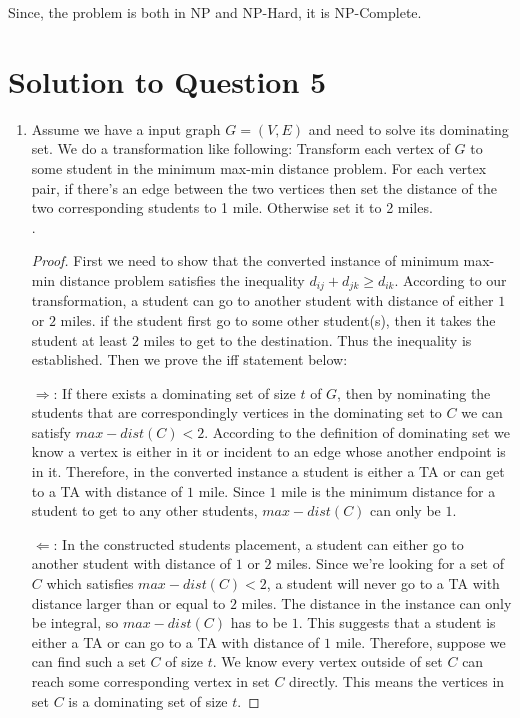 \documentclass[11pt]{article}
\begin{document}
   Since, the problem is both in NP and NP-Hard, it is NP-Complete.

\newpage
\section{Solution to Question 5} 

\begin{enumerate}[(1)]
  \item Assume we have a input graph $G = (V, E)$ and need to solve its dominating set.
We do a transformation like following: Transform each vertex of $G$ to some student in the minimum max-min distance problem.
For each vertex pair, if there's an edge between the two vertices then set the distance of the two corresponding students to 1 mile.
Otherwise set it to 2 miles. \\

.
\begin{proof}
	First we need to show that the converted instance of minimum max-min distance problem satisfies the inequality $d_{ij} + d_{jk} \geq d_{ik}$.
	According to our transformation, a student can go to another student with distance of either $1$ or $2$ miles.
	if the student first go to some other student(s), then it takes the student at least $2$ miles to get to the destination.
	Thus the inequality is established.
	Then we prove the iff statement below:

	$\Rightarrow$: If there exists a dominating set of size $t$ of $G$, then by nominating the students that are correspondingly vertices in the dominating set to $C$ we can satisfy $max-dist(C) < 2$. 
	According to the definition of dominating set we know a vertex is either in it or incident to an edge whose another endpoint is in it.
	Therefore, in the converted instance a student is either a TA or can get to a TA with distance of $1$ mile.
	Since $1$ mile is the minimum distance for a student to get to any other students, $max-dist(C)$ can only be $1$.

	$\Leftarrow$: In the constructed students placement, a student can either go to another student with distance of $1$ or $2$ miles.
	Since we're looking for a set of $C$ which satisfies $max-dist(C) < 2$, a student will never go to a TA with distance larger than or equal to $2$ miles.
	The distance in the instance can only be integral, so $max-dist(C)$ has to be $1$.
	This suggests that a student is either a TA or can go to a TA with distance of $1$ mile.
	Therefore, suppose we can find such a set $C$ of size $t$.
	We know every vertex outside of set $C$ can reach some corresponding vertex in set $C$ directly.
	This means the vertices in set $C$ is a dominating set of size $t$.
\end{proof}


\end{enumerate}
\end{document}
